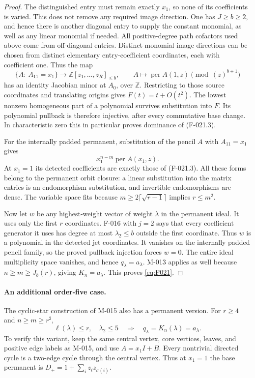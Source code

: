 \begin{proof}
The distinguished entry must remain exactly \(x_1\),
so none of its coefficients is varied. This does not remove
any required image direction. One has \(J\geq b\geq2\),
and hence there is another diagonal entry to supply the
constant monomial, as well as any linear monomial if needed.
All positive-degree path cofactors used above come from
off-diagonal entries. Distinct monomial image directions
can be chosen from distinct elementary entry-coefficient
coordinates, each with coefficient one. Thus the map
\[
 \{A:\ A_{11}=x_1\}\longrightarrow
 \mathbb Z[z_1,\ldots,z_R]_{\leq b},\qquad
 A\longmapsto\operatorname{per}A(1,z)\pmod{(z)^{b+1}}
                                                               \tag{F-021.3}
\]
has an identity Jacobian minor at \(A_0\), over
\(\mathbb Z\). Restricting to those source coordinates
and translating origins gives \(F(t)=t+O(t^2)\).
The lowest nonzero homogeneous part of a polynomial survives
substitution into \(F\). Its polynomial pullback is therefore
injective, after every commutative base change. In characteristic
zero this in particular proves dominance of (F-021.3).

For the internally padded permanent, substitution of the
pencil \(A\) with \(A_{11}=x_1\) gives
\[
                         x_1^{n-m}\operatorname{per}A(x_1,z).
\]
At \(x_1=1\) its detected coefficients are exactly those
of (F-021.3). All these forms belong to the permanent orbit
closure: a linear substitution into the matrix entries is
an endomorphism substitution, and invertible endomorphisms
are dense. The variable space fits because
\(m\geq2\lceil\sqrt{r-1}\rceil\) implies \(r\leq m^2\).

Now let \(w\) be any highest-weight vector of weight
\(\lambda\) in the permanent ideal. It uses only the
first \(r\) coordinates. F-016 with \(j=2\) says that
every coefficient generator it uses has degree at most
\(\lambda_2\leq b\) outside the first coordinate.
Thus \(w\) is a polynomial in the detected jet coordinates.
It vanishes on the internally padded pencil family, so
the proved pullback injection forces \(w=0\).
The entire ideal multiplicity space vanishes, and hence
\(q_\lambda=a_\lambda\). M-013 applies as well because
\(n\geq m\geq J_b(r)\), giving \(K_n=a_\lambda\).
This proves \eqref{eq:F021}.
\end{proof}

\paragraph{An additional order-five case.}
The cyclic-star construction of M-015 also has a permanent
version. For \(r\geq4\) and \(n\geq m\geq r^2\),
\begin{equation}\label{eq:F021five}
 \ell(\lambda)\leq r,\quad\lambda_2\leq5
       \quad\Longrightarrow\quad q_\lambda=K_n(\lambda)=a_\lambda.
\end{equation}
To verify this variant, keep the same central vertex, core
vertices, leaves, and positive edge labels as M-015, and
use \(A=x_1I+B\). Every nontrivial directed cycle is a
two-edge cycle through the central vertex. Thus at \(x_1=1\)
the base permanent is
\(D_+=1+\sum_i z_i z_{\sigma(i)}\).

